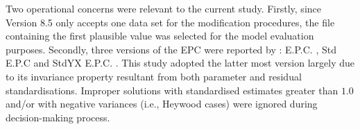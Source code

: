 Two operational concerns were relevant to the current study. Firstly, since \cM Version 8.5 only accepts one data set for the modification procedures, the file containing the first plausible value was selected for the model evaluation purposes. Secondly, three versions of the EPC were reported by \CM: \textsf{E.P.C.} \parencite{saris:1987}, \textsf{Std E.P.C} \parencite{kaplan:1989} and \textsf{StdYX E.P.C.} \parencite{chou:1993}. This study adopted the latter most version largely due to its invariance property resultant from both parameter and residual standardisations. Improper solutions with standardised estimates greater than $1.0$ and/or with negative variances (i.e., Heywood cases) were ignored during decision-making process.